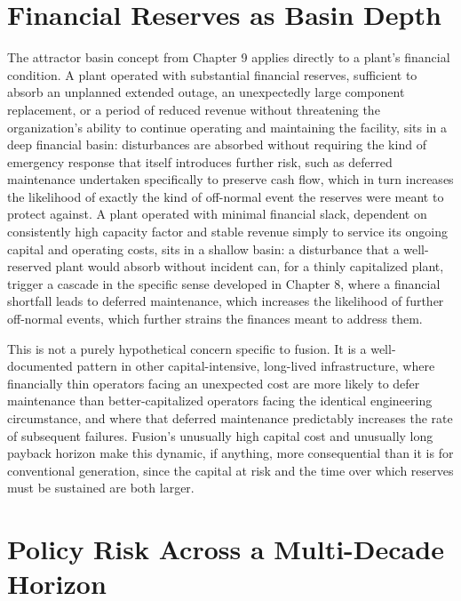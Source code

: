 \section{Financial Reserves as Basin Depth}

The attractor basin concept from Chapter 9 applies directly to a plant's financial condition. A plant operated with substantial financial reserves, sufficient to absorb an unplanned extended outage, an unexpectedly large component replacement, or a period of reduced revenue without threatening the organization's ability to continue operating and maintaining the facility, sits in a deep financial basin: disturbances are absorbed without requiring the kind of emergency response that itself introduces further risk, such as deferred maintenance undertaken specifically to preserve cash flow, which in turn increases the likelihood of exactly the kind of off-normal event the reserves were meant to protect against. A plant operated with minimal financial slack, dependent on consistently high capacity factor and stable revenue simply to service its ongoing capital and operating costs, sits in a shallow basin: a disturbance that a well-reserved plant would absorb without incident can, for a thinly capitalized plant, trigger a cascade in the specific sense developed in Chapter 8, where a financial shortfall leads to deferred maintenance, which increases the likelihood of further off-normal events, which further strains the finances meant to address them.

This is not a purely hypothetical concern specific to fusion. It is a well-documented pattern in other capital-intensive, long-lived infrastructure, where financially thin operators facing an unexpected cost are more likely to defer maintenance than better-capitalized operators facing the identical engineering circumstance, and where that deferred maintenance predictably increases the rate of subsequent failures. Fusion's unusually high capital cost and unusually long payback horizon make this dynamic, if anything, more consequential than it is for conventional generation, since the capital at risk and the time over which reserves must be sustained are both larger.

\section{Policy Risk Across a Multi-Decade Horizon}

